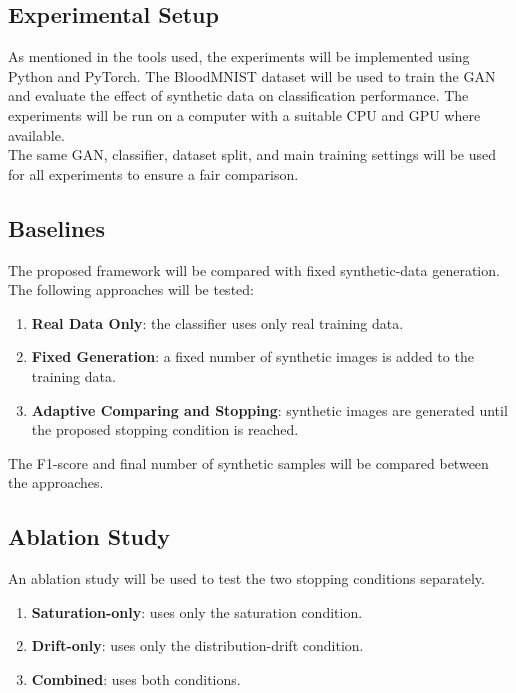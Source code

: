 \documentclass[12pt,a4paper]{report}
\begin{document}
\begin{justify}
\subsection{Experimental Setup}

As mentioned in the tools used, the experiments will be implemented using Python and PyTorch. The BloodMNIST dataset will be used to train the GAN and evaluate the effect of synthetic data on classification performance. The experiments will be run on a computer with a suitable CPU and GPU where available. \\

\noindent The same GAN, classifier, dataset split, and main training settings will be used for all experiments to ensure a fair comparison.

\subsection{Baselines}

The proposed framework will be compared with fixed synthetic-data generation. \\

\noindent The following approaches will be tested:

\begin{enumerate}
\item \textbf{Real Data Only}: the classifier uses only real training data.
\item \textbf{Fixed Generation}: a fixed number of synthetic images is added to the training data.
\item \textbf{Adaptive Comparing and Stopping}: synthetic images are generated until the proposed stopping condition is reached.
\end{enumerate}

\noindent The F1-score and final number of synthetic samples will be compared between the approaches.

\subsection{Ablation Study}

An ablation study will be used to test the two stopping conditions separately.

\begin{enumerate}
\item \textbf{Saturation-only}: uses only the saturation condition.
\item \textbf{Drift-only}: uses only the distribution-drift condition.
\item \textbf{Combined}: uses both conditions.
\end{enumerate}


\end{justify}
\end{document}
